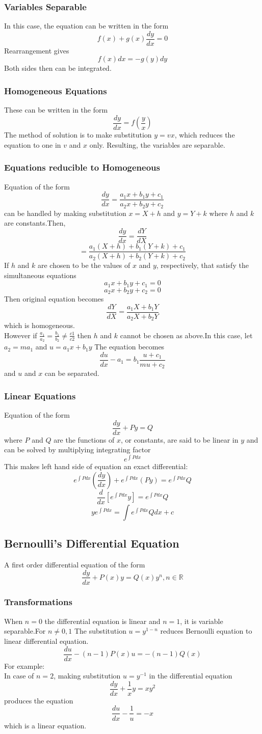 \documentclass[12pt]{article}
\begin{document}
\subsubsection{Variables Separable}
In this case, the equation can be written in the form $$f(x)+g(x)\frac{dy}{dx}=0$$ Rearrangement gives $$f(x)dx=-g(y)dy$$
Both sides then can be integrated.
\subsubsection{Homogeneous Equations}
These can be written in the form
$$\frac{dy}{dx}=f(\frac{y}{x})$$
The method of solution is to make substitution $y=vx$, which reduces the equation to one in $v$ and $x$ only. Resulting, the variables are separable.
\subsubsection{Equations reducible to Homogeneous}
Equation of the form  $$\frac{dy}{dx}=\frac{a_1x+b_1y+c_1}{a_2x+b_2y+c_2}$$ can be handled by making substitution $x=X+h$
and $y=Y+k$ where $h$ and $k$ are constants.Then, $$\frac{dy}{dx}=\frac{dY}{dX}$$ $$=\frac{a_1(X+h)+b_1(Y+k)+c_1}{a_2(X+h)+b_2(Y+k)+c_2}$$
If $h$ and $k$ are chosen to be the values of $x$ and $y$, respectively, that satisfy the simultaneous equations
$$a_1x+b_1y+c_1=0$$
$$a_2x+b_2y+c_2=0$$
Then original equation becomes $$\frac{dY}{dX}=\frac{a_1X+b_1Y}{a_2X+b_2Y}$$ which is homogeneous. \\
However if $\frac{a_1}{a_2}=\frac{b_1}{b_2} \not= \frac{c1}{c2}$ then $h$ and $k$ cannot be chosen as above.In this case, let $a_2=ma_1$ and $u=a_1x+b_1y$ The equation becomes $$\frac{du}{dx}-a_1=b_1 \frac{u+c_1}{mu+c_2}$$ and $u$ and $x$ can be separated.
\subsubsection{Linear Equations}
Equation of the form $$\frac{dy}{dx}+Py=Q$$ where $P$ and $Q$ are the functions of $x$, or constants, are said to be linear in $y$ and can be solved by multiplying integrating factor $$e^{\int Pdx}$$This makes left hand side of equation an exact differential:
$$e^{\int Pdx}(\frac{dy}{dx})+e^{\int Pdx}(Py)=e^{\int Pdx}Q$$
$$\frac{d}{dx}[e^{\int Pdx}y]=e^{\int Pdx}Q$$
$$ye^{\int Pdx}=\int e^{\int Pdx}Qdx+c$$
\subsection{Bernoulli's Differential Equation}
A first order differential equation of the form 
$$\frac{dy}{dx}+P(x)y=Q(x)y^n, n \in \mathbb{R}$$
\subsubsection{Transformations}
When $n=0$ the differential equation is linear and $n=1$, it is variable separable.For $n \not= 0,1$ The substitution $u=y^{1-n}$ reduces Bernoulli equation to linear differential equation.
$$\frac{du}{dx}-(n-1)P(x)u=-(n-1)Q(x)$$ 
For example: \\
In case of $n=2$, making substitution $u=y^{-1}$ in the differential equation 
$$\frac{dy}{dx}+\frac{1}{x}y=xy^2$$ produces the equation $$\frac{du}{dx}-\frac{1}{u}=-x$$ which is a linear equation.
\end{document}
